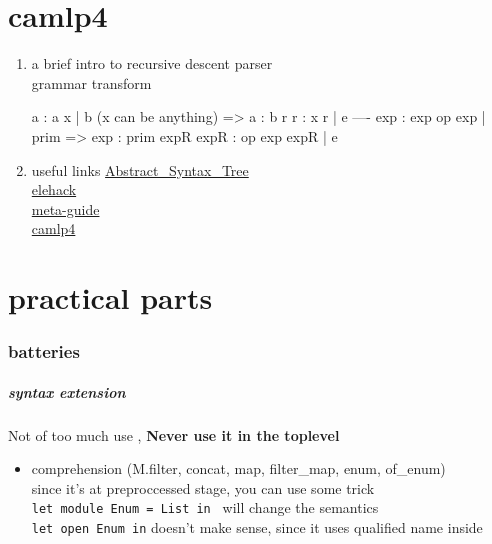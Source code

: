 \documentclass[svgnames,12pt,a4paper]{report}
\begin{document}
\chapter{camlp4}
\label{sec:camlp4}
\begin{enumerate}
\item a brief intro to recursive descent parser \\

  grammar transform
  \begin{bluetext}
    a : a x | b (x can be anything)
    =>
    a : b r
    r : x r | e
    ----
    exp : exp op exp | prim
    =>
    exp : prim expR
    expR : op exp expR | e 
  \end{bluetext}
  
  
  
  
  

\item useful links
  \href{http://brion.inria.fr/gallium/index.php/Abstract\_Syntax\_Tree}{Abstract\_Syntax\_Tree} \\
  \href{http://elehack.net/michael/blog/2010/06/ocaml-syntax-extension}{elehack} \\
  \href{http://andreiformiga.com/blog/?p=99}{meta-guide} \\
  \href{http://www.wisdomandwonder.com/link/5302/resources-for-learning-camlp4}{camlp4} \\

\end{enumerate}
\chapter{practical parts}


\subsection{batteries}

\paragraph{syntax extension}
Not of too much use , {\bf Never use it in the toplevel}
\begin{itemize}
\item comprehension (M.filter, concat, map, filter\_map, enum, of\_enum) \\
  since it's at preproccessed stage, you can use some trick \\
  \verb|let module Enum = List in | will change the semantics \\
  \verb|let open Enum in| doesn't make sense, since it uses qualified name inside
\end{itemize}
\end{document}
